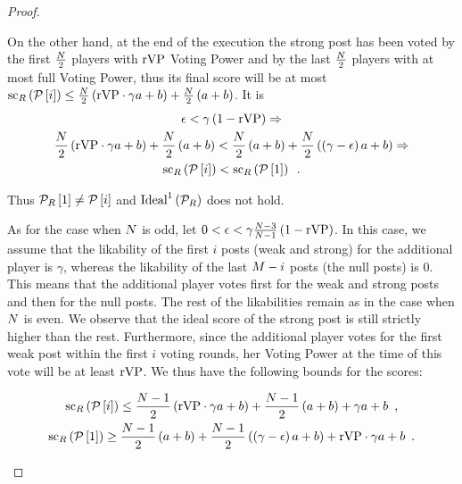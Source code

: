 \begin{proof}
\begin{itemize}
    On the other hand, at the end of the execution the strong post has been
    voted by the first $\frac{N}{2}$ players with $\mathrm{rVP}$
    Voting Power and by the last $\frac{N}{2}$ players with at most
    full Voting Power, thus its final score will be at most
    $\mathrm{sc}_{R}\left(\mathcal{P}\left[i\right]\right) \leq
    \frac{N}{2}\left(\mathrm{rVP} \cdot \gamma a + b\right) +
    \frac{N}{2}\left(a + b\right)$. It is
    \begin{gather*}
      \epsilon < \gamma\left(1 - \mathrm{rVP}\right) \Rightarrow \\
      \frac{N}{2}\left(\mathrm{rVP} \cdot \gamma a + b\right) +
      \frac{N}{2}\left(a + b\right) < \frac{N}{2}\left(a +
      b\right) + \frac{N}{2}\left(\left(\gamma - \epsilon\right) a +
      b\right) \Rightarrow \\
      \mathrm{sc}_{R}\left(\mathcal{P}\left[i\right]\right) <
      \mathrm{sc}_{R}\left(\mathcal{P}\left[1\right]\right) \enspace.
    \end{gather*}

    Thus $\mathcal{P}_{R}\left[1\right] \neq \mathcal{P}\left[i\right]$ and
    $\mathrm{Ideal}^1\left(\mathcal{P}_{R}\right)$ does not hold.

    As for the case when $N$ is odd, let $0 < \epsilon <
    \gamma\frac{N - 3}{N - 1}\left(1 - \mathrm{rVP}\right)$. In this
    case, we assume that the likability of the first $i$ posts (weak and strong)
    for the additional player is $\gamma$, whereas the likability of the last
    $M - i$ posts (the null posts) is 0. This means that the additional
    player votes first for the weak and strong posts and then for the null
    posts. The rest of the likabilities remain as in the case when $N$
    is even. We observe that the ideal score of the strong post is still
    strictly higher than the rest. Furthermore, since the additional player
    votes for the first weak post within the first $i$ voting rounds, her Voting
    Power at the time of this vote will be at least $\mathrm{rVP}$. We thus have the
    following bounds for the scores:

    \begin{gather*}
      \mathrm{sc}_{R}\left(\mathcal{P}\left[i\right]\right) \leq
      \frac{N - 1}{2}\left(\mathrm{rVP} \cdot \gamma a + b\right) +
      \frac{N - 1}{2}\left(a + b\right) + \gamma a + b \enspace, \\
      \mathrm{sc}_{R}\left(\mathcal{P}\left[1\right]\right) \geq
      \frac{N - 1}{2}\left(a + b\right) + \frac{N -
      1}{2}\left(\left(\gamma - \epsilon\right) a + b\right) + \mathrm{rVP} \cdot \gamma
      a + b \enspace.
    \end{gather*}


\end{itemize}
\end{proof}
